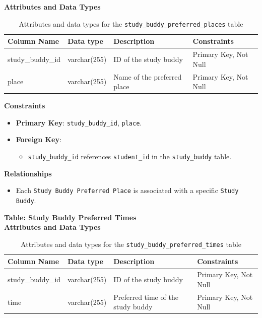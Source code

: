\documentclass[12pt]{article}
\begin{document}
    \textbf{Attributes and Data Types}
    \begin{table}[H] 
        \centering 
        \renewcommand{\arraystretch}{1.5} 
        \begin{tabular}{|l|l|p{4.5cm}|l|} 
        \hline 
        \rowcolor[HTML]{96FFFB} 
        \textbf{Column Name} & \textbf{Data type} & \textbf{Description} & \textbf{Constraints} \\ \hline 
        study\_buddy\_id & varchar(255) & ID of the study buddy & Primary Key, Not Null \\ \hline 
        place & varchar(255) & Name of the preferred place & Primary Key, Not Null \\ \hline 
        \end{tabular} 
        \caption{Attributes and data types for the \texttt{study\_buddy\_preferred\_places} table} 
    \end{table}

    \noindent 
    \textbf{Constraints} 
    \begin{itemize} 
        \item \textbf{Primary Key}: \texttt{study\_buddy\_id}, \texttt{place}. 
        \item \textbf{Foreign Key}: \begin{itemize} \item \texttt{study\_buddy\_id} references \texttt{student\_id} in the \texttt{study\_buddy} table. 
        \end{itemize} 
    \end{itemize}

    \noindent 
    \textbf{Relationships} 
    \begin{itemize} 
        \item Each \texttt{Study Buddy Preferred Place} is associated with a specific \texttt{Study Buddy}.
    \end{itemize}

    \textbf{Table: Study Buddy Preferred Times} \\

    \textbf{Attributes and Data Types}
    \begin{table}[H] 
        \centering 
        \renewcommand{\arraystretch}{1.5} 
        \begin{tabular}{|l|l|p{4.5cm}|l|} 
        \hline 
        \rowcolor[HTML]{96FFFB} 
        \textbf{Column Name} & \textbf{Data type} & \textbf{Description} & \textbf{Constraints} \\ \hline 
        study\_buddy\_id & varchar(255) & ID of the study buddy & Primary Key, Not Null \\ \hline 
        time & varchar(255) & Preferred time of the study buddy & Primary Key, Not Null \\ \hline 
        \end{tabular} 
        \caption{Attributes and data types for the \texttt{study\_buddy\_preferred\_times} table} 
    \end{table}
\end{document}
